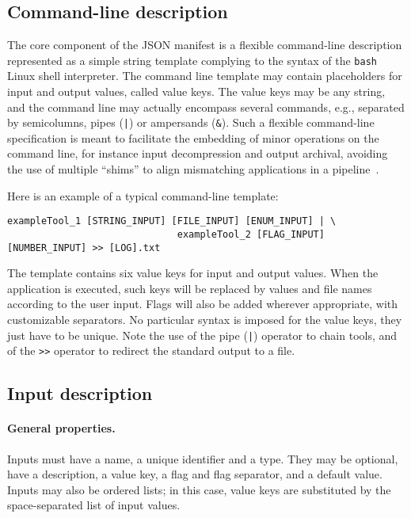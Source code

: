 \documentclass{article}
\begin{document}
\subsection{Command-line description}

The core component of the JSON manifest is a flexible command-line
description represented as a simple string template complying to the
syntax of the \texttt{bash} Linux shell interpreter. The command line
template may contain placeholders for input and output values, called
value keys. The value keys may be any string, and the
command line may actually encompass several commands, e.g., separated
by semicolumns, pipes (\texttt{|}) or ampersands (\texttt{\&}). Such a
flexible command-line specification is meant to facilitate the
embedding of minor operations on the command line, for instance input
decompression and output archival, avoiding the use of multiple
``shims'' to align mismatching applications in a
pipeline~\cite{hull2004treating}.

Here is an example of a typical command-line template:
\begin{verbatim}
exampleTool_1 [STRING_INPUT] [FILE_INPUT] [ENUM_INPUT] | \
                              exampleTool_2 [FLAG_INPUT] [NUMBER_INPUT] >> [LOG].txt
\end{verbatim}
The template contains six value keys for input and output
values. When the application is executed, such keys will be replaced
by values and file names according to the user input. Flags will also
be added wherever appropriate, with customizable separators. No
particular syntax is imposed for the value keys, they just have
to be unique.  Note the use of the pipe (\texttt{|}) operator to chain
tools, and of the \texttt{>>} operator to redirect the standard output
to a file.

\subsection{Input description}

\paragraph{General properties.} Inputs must have a name, a unique
identifier and a type. They may be optional, have a description, a
value key, a flag and flag separator, and a default
value. Inputs may also be ordered lists; in this case, value
keys are substituted by the space-separated list of input values.
\end{document}
